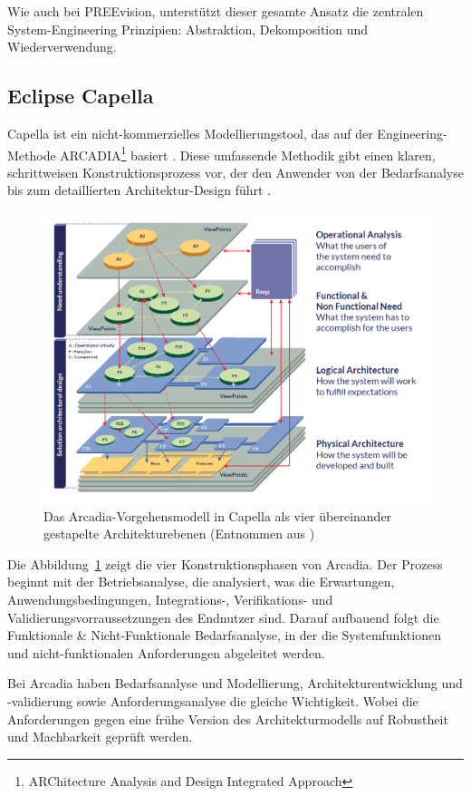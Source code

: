 Wie auch bei PREEvision, unterstützt dieser gesamte Ansatz die zentralen System-Engineering Prinzipien: Abstraktion, Dekomposition und Wiederverwendung\cite{The24}.

\subsection{Eclipse Capella}
Capella ist ein nicht-kommerzielles Modellierungstool, das auf der Engineering-Methode ARCADIA\footnote{ARChitecture Analysis and Design Integrated Approach} basiert \cite{roques2016mbse}. Diese umfassende Methodik gibt einen klaren, schrittweisen Konstruktionsprozess vor, der den Anwender von der Bedarfsanalyse bis zum detaillierten Architektur-Design führt \cite{let24}.

\begin{figure}[h!]
  \centering
  \includegraphics[width=.7\textwidth]{figures/03StandDerTechnik/phases_arcadia.png}
  \caption{Das Arcadia-Vorgehensmodell in Capella als vier übereinander gestapelte Architekturebenen (Entnommen aus \cite{let24})}
  \label{fig:capella_modell}
\end{figure}

Die Abbildung~\ref{fig:capella_modell} zeigt die vier Konstruktionsphasen von Arcadia. Der Prozess beginnt mit der Betriebsanalyse, die analysiert, was die Erwartungen, Anwendungsbedingungen, Integrations-, Verifikations- und Validierungsvorraussetzungen des Endnutzer sind. Darauf aufbauend folgt die Funktionale \& Nicht-Funktionale Bedarfsanalyse, in der die Systemfunktionen und nicht-funktionalen Anforderungen abgeleitet werden.

Bei Arcadia haben Bedarfsanalyse und Modellierung, Architekturentwicklung und -validierung sowie Anforderungsanalyse die gleiche Wichtigkeit. Wobei die Anforderungen gegen eine frühe Version des Architekturmodells auf Robustheit und Machbarkeit geprüft werden.

